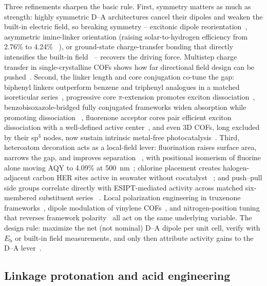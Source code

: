 Three refinements sharpen the basic rule. First, symmetry matters as much
as strength: highly symmetric D--A architectures cancel their dipoles and
weaken the built-in electric field, so breaking symmetry -- excitonic
dipole reorientation~\cite{bao2025excitonic}, asymmetric imine-linker
orientation (raising solar-to-hydrogen efficiency from 2.76\% to 4.24\%
~\cite{luo2024asymmetric}), or ground-state charge-transfer bonding that
directly intensifies the built-in field~\cite{shen2025ground} -- recovers
the driving force. Multistep charge transfer in single-crystalline COFs
shows how far directional field design can be pushed~\cite{jin2026abnormal}.
Second, the linker length and core conjugation co-tune the gap: biphenyl
linkers outperform benzene and triphenyl analogues in a matched isoreticular
series~\cite{dong2025synergistic}, progressive core $\pi$-extension promotes
exciton dissociation~\cite{li2026progressive}, benzobisoxazole-bridged
fully conjugated frameworks widen absorption while promoting dissociation
~\cite{liu2025fully}, fluorenone acceptor cores pair efficient exciton
dissociation with a well-defined active center~\cite{hao2023fluorenone}, and even 3D COFs, long excluded by their sp$^3$ nodes,
now sustain intrinsic metal-free photocatalysis~\cite{wang2024molecular}.
Third, heteroatom decoration acts as a local-field lever: fluorination
raises surface area, narrows the gap, and improves separation
~\cite{liu2021a}, with positional isomerism of fluorine alone moving AQY to
4.09\% at 500~nm~\cite{zhu2025fluorination}; chlorine placement creates
halogen-adjacent carbon HER sites active in seawater without cocatalyst
~\cite{ma2025engineering}; and push--pull side groups correlate directly
with ESIPT-mediated activity across matched six-membered substituent series
~\cite{huang2024regulating,jiang2024significant}. Local polarization
engineering in truxenone frameworks~\cite{hao2024regulating}, dipole
modulation of vinylene COFs~\cite{wang2024dipole}, and nitrogen-position
tuning that reverses framework polarity~\cite{haase2017structure} all act on
the same underlying variable. The design rule: maximize the net (not
nominal) D--A dipole per unit cell, verify with $E_\mathrm{b}$ or built-in
field measurements, and only then attribute activity gains to the D--A
lever~\cite{qian2023computation,bao2025excitonic}.

\subsection{Linkage protonation and acid engineering}
\label{sec:protonation}

